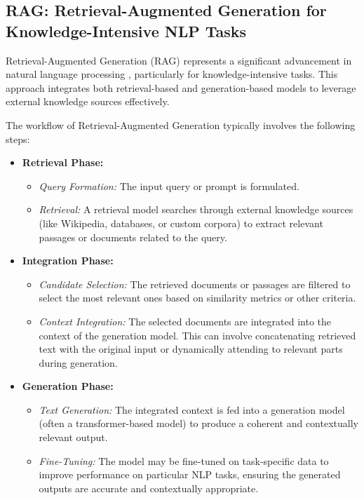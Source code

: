 \subsection{RAG: Retrieval-Augmented Generation for Knowledge-Intensive NLP Tasks}


Retrieval-Augmented Generation (RAG) represents a significant advancement in natural language processing \cite{lewis2020retrieval}, particularly for knowledge-intensive tasks. This approach integrates both retrieval-based and generation-based models to leverage external knowledge sources effectively. 

The workflow of Retrieval-Augmented Generation typically involves the following steps:
\begin{itemize}
    \item \textbf{Retrieval Phase:}
    \begin{itemize}
        \item \textit{Query Formation:} The input query or prompt is formulated.
        \item \textit{Retrieval:} A retrieval model searches through external knowledge sources (like Wikipedia, databases, or custom corpora) to extract relevant passages or documents related to the query.
    \end{itemize}
    \item \textbf{Integration Phase:}
    \begin{itemize}
        \item \textit{Candidate Selection:} The retrieved documents or passages are filtered to select the most relevant ones based on similarity metrics or other criteria.
        \item \textit{Context Integration:} The selected documents are integrated into the context of the generation model. This can involve concatenating retrieved text with the original input or dynamically attending to relevant parts during generation.
    \end{itemize}
    \item \textbf{Generation Phase:}
    \begin{itemize}
        \item \textit{Text Generation:} The integrated context is fed into a generation model (often a transformer-based model) to produce a coherent and contextually relevant output.
        \item \textit{Fine-Tuning:} The model may be fine-tuned on task-specific data to improve performance on particular NLP tasks, ensuring the generated outputs are accurate and contextually appropriate.
    \end{itemize}
\end{itemize}

